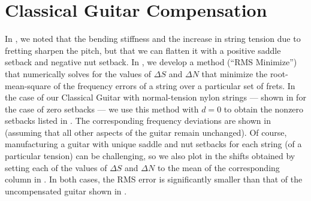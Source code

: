 %
%
%

 \section{Classical Guitar Compensation\label{sct:comp}}

 In , we noted that the bending stiffness and the increase in string tension due to fretting sharpen the pitch, but that we can flatten it with a positive saddle setback and negative nut setback. In , we develop a method (``RMS Minimize'') that numerically solves  for the values of $\Delta S$ and $\Delta N$ that minimize the root-mean-square of the frequency errors of a string over a particular set of frets. In the case of our Classical Guitar with normal-tension nylon strings --- shown in  for the case of zero setbacks --- we use this method with $d = 0$ to obtain the nonzero setbacks listed in . The corresponding frequency deviations are shown in  (assuming that all other aspects of the guitar remain unchanged). Of course, manufacturing a guitar with unique saddle and nut setbacks for each string (of a particular tension) can be challenging, so we also plot in  the shifts obtained by setting each of the values of $\Delta S$ and $\Delta N$ to the mean of the corresponding column in  . In both cases, the RMS error is significantly smaller than that of the uncompensated guitar shown in .

